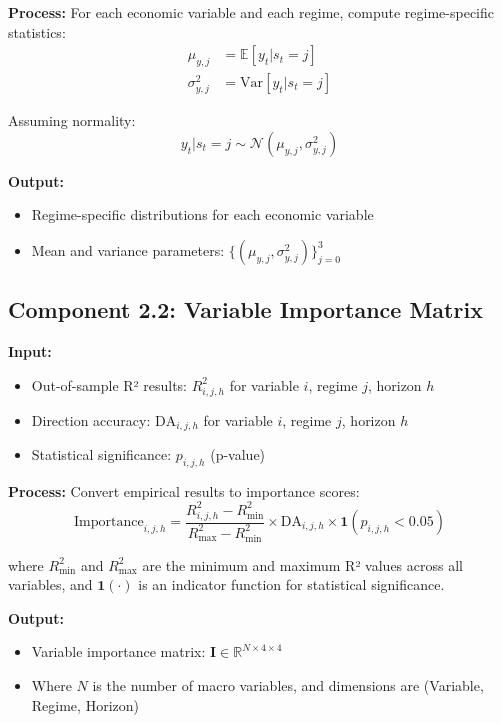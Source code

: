 \documentclass[11pt,a4paper]{article}
\begin{document}
\textbf{Process:}
For each economic variable and each regime, compute regime-specific statistics:
\begin{align}
    \mu_{y,j} &= \mathbb{E}[y_t | s_t = j] \\
    \sigma_{y,j}^2 &= \text{Var}[y_t | s_t = j]
\end{align}

Assuming normality:
\begin{equation}
    y_t | s_t = j \sim \mathcal{N}(\mu_{y,j}, \sigma_{y,j}^2)
\end{equation}

\textbf{Output:}
\begin{itemize}
    \item Regime-specific distributions for each economic variable
    \item Mean and variance parameters: $\{(\mu_{y,j}, \sigma_{y,j}^2)\}_{j=0}^{3}$
\end{itemize}

\subsection{Component 2.2: Variable Importance Matrix}

\textbf{Input:}
\begin{itemize}
    \item Out-of-sample R² results: $R^2_{i,j,h}$ for variable $i$, regime $j$, horizon $h$
    \item Direction accuracy: $\text{DA}_{i,j,h}$ for variable $i$, regime $j$, horizon $h$
    \item Statistical significance: $p_{i,j,h}$ (p-value)
\end{itemize}

\textbf{Process:}
Convert empirical results to importance scores:
\begin{equation}
    \text{Importance}_{i,j,h} = \frac{R^2_{i,j,h} - R^2_{\min}}{R^2_{\max} - R^2_{\min}} \times \text{DA}_{i,j,h} \times \mathbf{1}(p_{i,j,h} < 0.05)
\end{equation}

where $R^2_{\min}$ and $R^2_{\max}$ are the minimum and maximum R² values across all variables, and $\mathbf{1}(\cdot)$ is an indicator function for statistical significance.

\textbf{Output:}
\begin{itemize}
    \item Variable importance matrix: $\mathbf{I} \in \mathbb{R}^{N \times 4 \times 4}$
    \item Where $N$ is the number of macro variables, and dimensions are (Variable, Regime, Horizon)
\end{itemize}
\end{document}
